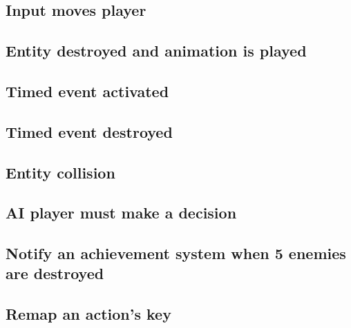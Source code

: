 \documentclass[12pt]{article}
\begin{document}
\subsection{Input moves player}
\subsection{Entity destroyed and animation is played}
\subsection{Timed event activated}
\subsection{Timed event destroyed}
\subsection{Entity collision}
\subsection{AI player must make a decision}
\subsection{Notify an achievement system when 5 enemies are destroyed}
\subsection{Remap an action's key}
\end{document}
